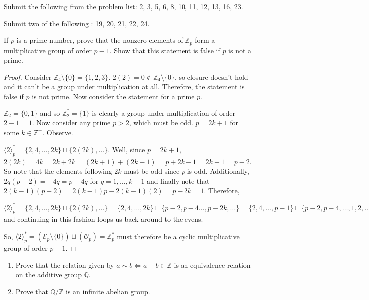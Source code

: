 \documentclass[addpoints,10pt]{exam}
\theoremstyle{plain}
\theoremstyle{definition}
\newtheorem{prob}[thm]{Problem}
\theoremstyle{plain}
\theoremstyle{plain}
\theoremstyle{definition}
\let\oldprob\prob
\let\endoldprob\endprob
\renewenvironment{prob}
  {\begin{singlespace}\oldprob}
  {\endoldprob\end{singlespace}}
\newcommand{\belowtitle}{\leavevmode\newline}
\newcommand{\ZZ}{\ensuremath{\mathbb{Z}}}
\begin{document}
Submit the following from the problem list: 2, 3, 5, 6, 8, 10, 11, 12, 13, 16, 23.

Submit two of the following : 19, 20, 21, 22, 24.

\begin{prob}
If $p$ is a prime number, prove that the nonzero elements of $\mathbb{Z}_p$ form a multiplicative group of order $p-1$. Show that this statement is false if $p$ is not a prime.
\end{prob}

    \begin{proof} Consider $\ZZ_{4}\setminus\{0\}=\{1,2,3\}$. $2(2)=0\not\in \ZZ_{4}\setminus\{0\}$, so closure doesn't hold and it can't be a group under multiplication at all. Therefore, the statement is false if $p$ is not prime. Now consider the statement for a prime $p$.
        
    $\ZZ_{2}=\{0,1\}$ and so $\ZZ^{*}_{2}=\{1\}$ is clearly a group under multiplication of order $2-1=1$. Now consider any prime $p>2$, which must be odd. $p=2k+1$ for some $k\in \ZZ^{+}$. Observe.

    $\langle 2\rangle^{*}_{p}=\{2,4,\hdots, 2k\}\sqcup \{2(2k),\hdots\}$. Well, since $p=2k+1$, $2(2k)=4k=2k+2k=(2k+1)+(2k-1)=p+2k-1=2k-1=p-2$. So note that the elements following $2k$ must be odd since $p$ is odd. Additionally, $2q(p-2)=-4q=p-4q$ for $q=1,\hdots, k-1$ and finally note that $2(k-1)(p-2)=2(k-1)p-2(k-1)(2)=p-2k=1$. Therefore,

    $\langle 2\rangle^{*}_{p}=\{2,4,\hdots, 2k\}\sqcup \{2(2k),\hdots\}=\{2,4,\hdots, 2k\}\sqcup \{p-2,p-4\hdots,p-2k,\hdots\}=\{2,4,\hdots,p-1\}\sqcup \{p-2,p-4,\hdots,1,2,\hdots\}$ and continuing in this fashion loops us back around to the evens.

    So, $\langle 2\rangle^{*}_{p}=(\mathcal{E}_{p}\setminus\{0\})\sqcup (\mathcal{O}_{p})=\ZZ^{*}_{p}$ must therefore be a cyclic multiplicative group of order $p-1$.

\end{proof}
\newpage
\begin{prob}\belowtitle
\begin{enumerate}[label=(\alph*)]
\item Prove that the relation given by $a \sim b \iff a - b \in \mathbb{Z}$ is an equivalence relation on the additive group $\mathbb{Q}$.
\item Prove that $\mathbb{Q}/\mathbb{Z}$ is an infinite abelian group.
\end{enumerate}
\end{prob}
\end{document}
